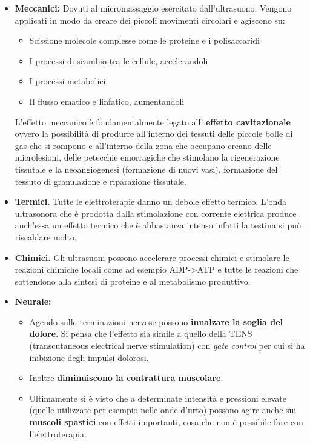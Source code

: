 \begin{itemize}
\item
  \textbf{Meccanici:} Dovuti al micromassaggio esercitato
  dall'ultrasuono. Vengono applicati in modo da creare dei piccoli
  movimenti circolari e agiscono su:

\begin{itemize}
\item
  Scissione molecole complesse come le proteine e i polisaccaridi
\item
  I processi di scambio tra le cellule, accelerandoli
\item
  I processi metabolici
\item
  Il flusso ematico e linfatico, aumentandoli
\end{itemize}

L'effetto meccanico è fondamentalmente legato all' \textbf{effetto
cavitazionale} ovvero la possibilità di produrre all'interno dei tessuti
delle piccole bolle di gas che si rompono e all'interno della zona che
occupano creano delle microlesioni, delle petecchie emorragiche che
stimolano la rigenerazione tissutale e la neoangiogenesi (formazione di
nuovi vasi), formazione del tessuto di granulazione e riparazione
tissutale.

\item
  \textbf{Termici.} Tutte le elettroterapie danno un debole effetto
  termico. L'onda ultrasonora che è prodotta dalla stimolazione con
  corrente elettrica produce anch'essa un effetto termico che è
  abbastanza intenso infatti la testina si può riscaldare molto.
\item
  \textbf{Chimici.} Gli ultrasuoni possono accelerare processi chimici e
  stimolare le reazioni chimiche locali come ad esempio
  ADP-\textgreater{}ATP e tutte le reazioni che sottendono alla sintesi
  di proteine e al metabolismo produttivo.
\item
  \textbf{Neurale:}

\begin{itemize}
\item
  Agendo sulle terminazioni nervose possono \textbf{innalzare la soglia
  del dolore}. Si pensa che l'effetto sia simile a quello della TENS
  (transcutaneous electrical nerve stimulation) con \emph{gate control}
  per cui si ha inibizione degli impulsi dolorosi.
\item
  Inoltre \textbf{diminuiscono la contrattura muscolare}.
\item
  Ultimamente si è visto che a determinate intensità e pressioni elevate
  (quelle utilizzate per esempio nelle onde d'urto) possono agire anche
  sui \textbf{muscoli spastici} con effetti importanti, cosa che non è
  possibile fare con l'elettroterapia.
\end{itemize}
\end{itemize}

